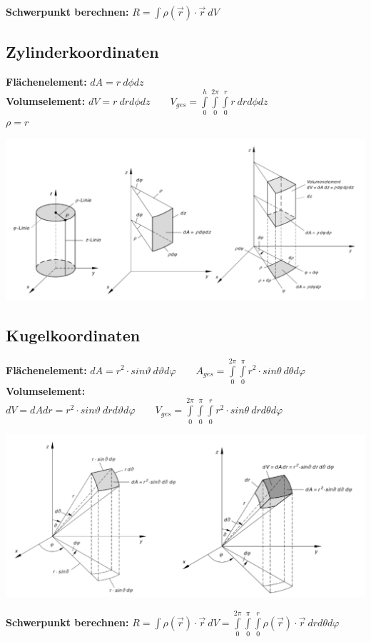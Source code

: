 \textbf{Schwerpunkt berechnen:} $R=\int \rho(\vec{r}) \cdot \vec{r}\ dV$

\subsection{Zylinderkoordinaten}
\textbf{Flächenelement:} $dA= r\ d\phi dz $\\
\textbf{Volumselement:} $dV=r\ dr d\phi dz \qquad V_{ges}= \int\limits_{0}^{h}\int\limits_{0}^{2\pi}\int\limits_{0}^{r} r\ dr d\phi dz$\\
$\rho = r$

\includegraphics[width=\textwidth]{../pictures/Zylinderkoordinaten.png}

\subsection{Kugelkoordinaten}
\textbf{Flächenelement:} $dA=r^2 \cdot sin \vartheta \ d\vartheta d\varphi \qquad A_{ges} = \int\limits_{0}^{2\pi} \int\limits_{0}^{\pi} r^2\cdot sin\theta \ d\theta d\varphi$\\
\textbf{Volumselement:} $dV= dAdr =r^2 \cdot sin \vartheta \ dr d\vartheta d\varphi \qquad V_{ges} = \int\limits_{0}^{2\pi} \int\limits_{0}^{\pi} \int\limits_{0}^{r}r^2\cdot sin\theta \ dr d\theta d\varphi$

\includegraphics[width=.8\textwidth]{../pictures/Kugelkoordinaten.png}


\textbf{Schwerpunkt berechnen:} $R=\int \rho(\vec{r}) \cdot \vec{r}\ dV = \int\limits_{0}^{2\pi} \int\limits_{0}^{\pi} \int\limits_{0}^{r} \rho(\vec{r}) \cdot \vec{r}\ dr d\theta d\varphi$